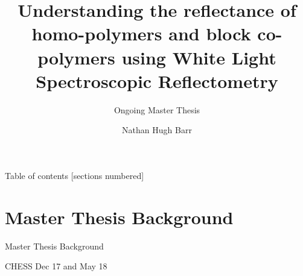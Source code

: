 \documentclass[10pt]{beamer}
\title{Understanding the reflectance of homo-polymers and block co-polymers using White Light Spectroscopic Reflectometry}
\subtitle{Ongoing Master Thesis}
\date{}
\author{Nathan Hugh Barr}
\institute{Roskilde University}
\begin{document}
\maketitle

\begin{frame}{Table of contents}
  [sections numbered]
  \tableofcontents[hideallsubsections]
\end{frame}

	\section{Master Thesis Background}

	\begin{frame}{Master Thesis Background}

CHESS Dec 17 and May 18


\end{frame}
\end{document}
